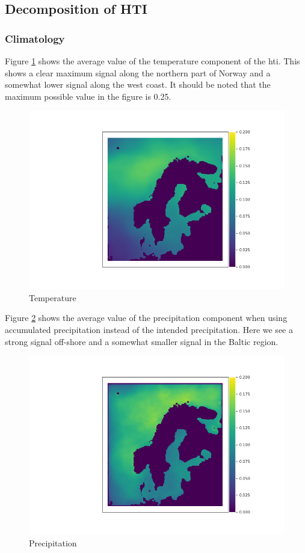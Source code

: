 \subsection{Decomposition of HTI}

\subsubsection{Climatology}
Figure \ref{fig:temperaturemeps} shows the average value of the temperature component of the \acrshort{hti}. This shows a clear maximum signal along the northern part of Norway and a somewhat lower signal along the west coast. It should be noted that the maximum possible value in the figure is 0.25. 

\begin{figure}
    \centering
    \includegraphics[width = \textwidth]{Figures/T.png}
    \caption{Temperature}
    \label{fig:temperaturemeps}
\end{figure}

Figure \ref{fig:precipitationmeps} shows the average value of the precipitation component when using accumulated precipitation instead of the intended precipitation. Here we see a strong signal off-shore and a somewhat smaller signal in the Baltic region. 

\begin{figure}
    \centering
    \includegraphics[width = \textwidth]{Figures/P.png}
    \caption{Precipitation}
    \label{fig:precipitationmeps}
\end{figure}

